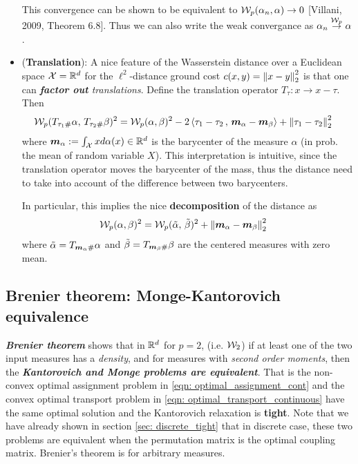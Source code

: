 \documentclass[11pt]{article}
\begin{document}
\begin{itemize}
\begin{definition}
This convergence can be shown to be equivalent to ${\mathcal W}_{p}(\alpha_{n}, \alpha) \rightarrow 0$ [Villani, 2009, Theorem 6.8]. Thus we can also write the weak convergance as $\alpha_{n}\stackrel{{\mathcal W}_{p}}{\rightarrow} \alpha$.
\end{definition}


\item (\textbf{Translation}): A nice feature of the Wasserstein distance over a Euclidean space ${\mathcal X} = {\mathbb R}^d$ for the $\ell^2$-distance ground cost $c(x, y) = \left\|x - y\right\|_{2}^2$ is that one can \emph{\textbf{factor out} translations}. Define the translation operator $T_{\tau}: x \rightarrow x-\tau$. Then 
\begin{align}
{\mathcal W}_{p}(T_{\tau_1 \#}\alpha, \,T_{\tau_{2} \#} \beta)^2 &= {\mathcal W}_{p}(\alpha, \beta)^2 -2 \left\langle \tau_1 - \tau_{2}\,,\, \boldsymbol{m}_{\alpha} - \boldsymbol{m}_{\beta} \right\rangle + \left\|\tau_1 - \tau_{2}\right\|_{2}^2 \label{eqn: translation_wasserstein_dis}
\end{align} where $\boldsymbol{m}_{\alpha} := \int_{{\mathcal X}} x d\alpha(x) \in {\mathbb R}^{d}$ is the barycenter of  the measure $\alpha$ (in prob. the mean of random variable $X$). This interpretation is intuitive, since the translation operator moves the barycenter of the mass, thus the distance need to take into account of the difference between two barycenters. 

In particular, this implies the nice \textbf{decomposition} of the distance as
\begin{align}
{\mathcal W}_{p}(\alpha, \beta)^2 &= {\mathcal W}_{p}(\tilde{\alpha}, \,\tilde{\beta})^2  + \left\|\boldsymbol{m}_{\alpha} - \boldsymbol{m}_{\beta}\right\|_{2}^2 \label{eqn: translation_wasserstein_dis2}
\end{align} where $\tilde{\alpha} = T_{\boldsymbol{m}_{\alpha} \#}\alpha$ and $\tilde{\beta} = T_{\boldsymbol{m}_{\beta} \#}\beta$ are the centered measures with zero mean.
\end{itemize}



\subsection{Brenier theorem: Monge-Kantorovich equivalence}
\emph{\textbf{Brenier theorem}} shows that in ${\mathbb R}^d$ for $p = 2$, (i.e. ${\mathcal W}_{2}$) if at least one of the two input measures has a \emph{density}, and for measures with \emph{second order moments}, then the \emph{\textbf{Kantorovich and Monge problems are equivalent}}.  That is the non-convex optimal assignment problem in \eqref{eqn: optimal_assignment_cont} and the convex optimal transport problem in \eqref{eqn: optimal_transport_continuous} have the same optimal solution and the Kantorovich relaxation is \textbf{tight}. Note that we have already shown in section \ref{sec: discrete_tight} that in discrete case, these two problems are equivalent when the permutation matrix is the optimal coupling matrix. Brenier's theorem is for arbitrary measures.
\end{document}
